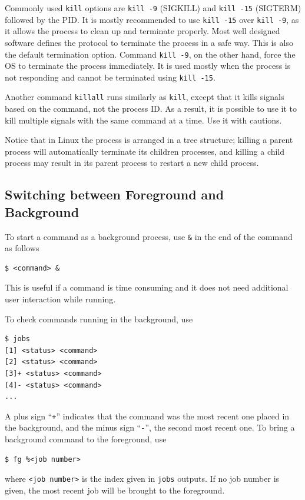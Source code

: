 Commonly used \verb|kill| options are \verb|kill -9| (SIGKILL) and \verb|kill -15| (SIGTERM) followed by the PID. It is mostly recommended to use \verb|kill -15| over \verb|kill -9|, as it allows the process to clean up and terminate properly. Most well designed software defines the protocol to terminate the process in a safe way. This is also the default termination option. Command \verb|kill -9|, on the other hand, force the OS to terminate the process immediately. It is used mostly when the process is not responding and cannot be terminated using \verb|kill -15|.

Another command \verb|killall| runs similarly as \verb|kill|, except that it kills signals based on the command, not the process ID. As a result, it is possible to use it to kill multiple signals with the same command at a time. Use it with cautions.

Notice that in Linux the process is arranged in a tree structure; killing a parent process will automatically terminate its children processes, and killing a child process may result in its parent process to restart a new child process.

\subsection{Switching between Foreground and Background}

To start a command as a background process, use \verb|&| in the end of the command as follows
\begin{lstlisting}
$ <command> &
\end{lstlisting}
This is useful if a command is time consuming and it does not need additional user interaction while running.

To check commands running in the background, use
\begin{lstlisting}
$ jobs
[1] <status> <command>
[2] <status> <command>
[3]+ <status> <command>
[4]- <status> <command>
...
\end{lstlisting}
A plus sign ``\verb|+|'' indicates that the command was the most recent one placed in the background, and the minus sign ``\verb|-|'', the second most recent one. To bring a background command to the foreground, use
\begin{lstlisting}
$ fg %<job number>
\end{lstlisting}
where \verb|<job number>| is the index given in \verb|jobs| outputs. If no job number is given, the most recent job will be brought to the foreground.


